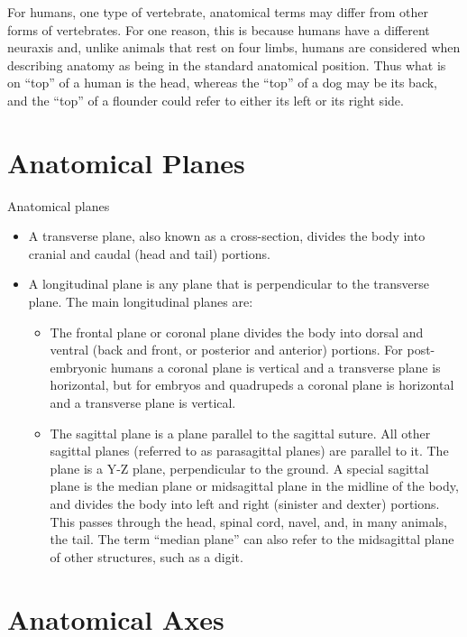 \documentclass[]{book}
\providecommand{\tightlist}{%
  \setlength{\itemsep}{0pt}\setlength{\parskip}{0pt}}
\begin{document}
For humans, one type of vertebrate, anatomical terms may differ from other forms of vertebrates. For one reason, this is because humans have a different neuraxis and, unlike animals that rest on four limbs, humans are considered when describing anatomy as being in the standard anatomical position. Thus what is on ``top'' of a human is the head, whereas the ``top'' of a dog may be its back, and the ``top'' of a flounder could refer to either its left or its right side.

\hypertarget{anatomical-planes}{%
\section{Anatomical Planes}\label{anatomical-planes}}

Anatomical planes

\begin{itemize}
\tightlist
\item
  A transverse plane, also known as a cross-section, divides the body into cranial and caudal (head and tail) portions.
\item
  A longitudinal plane is any plane that is perpendicular to the transverse plane. The main longitudinal planes are:

  \begin{itemize}
  \tightlist
  \item
    The frontal plane or coronal plane divides the body into dorsal and ventral (back and front, or posterior and anterior) portions. For post-embryonic humans a coronal plane is vertical and a transverse plane is horizontal, but for embryos and quadrupeds a coronal plane is horizontal and a transverse plane is vertical.
  \item
    The sagittal plane is a plane parallel to the sagittal suture. All other sagittal planes (referred to as parasagittal planes) are parallel to it. The plane is a Y-Z plane, perpendicular to the ground. A special sagittal plane is the median plane or midsagittal plane in the midline of the body, and divides the body into left and right (sinister and dexter) portions. This passes through the head, spinal cord, navel, and, in many animals, the tail. The term ``median plane'' can also refer to the midsagittal plane of other structures, such as a digit.
  \end{itemize}
\end{itemize}

\hypertarget{anatomical-axes}{%
\section{Anatomical Axes}\label{anatomical-axes}}
\end{document}
